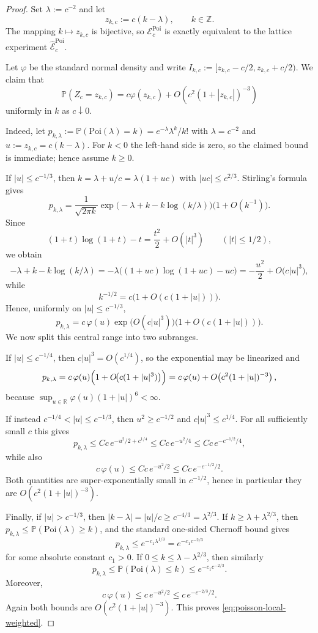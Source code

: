 \documentclass[10pt,a4paper]{amsart}
\newcommand{\Pbb}{\mathbb P}
\newcommand{\Poi}{\mathrm{Poi}}
\newcommand{\R}{\mathbb R}
\begin{document}
\begin{proof}
Set $\lambda:=c^{-2}$ and let
\[
z_{k,c}:=c(k-\lambda),\qquad k\in\mathbb Z.
\]
The mapping $k\mapsto z_{k,c}$ is bijective, so $\mathcal E_c^{\mathrm{Poi}}$ is exactly equivalent to the lattice
experiment $\widehat{\mathcal E}_c^{\mathrm{Poi}}$.

Let $\varphi$ be the standard normal density and write $I_{k,c}:=[z_{k,c}-c/2,z_{k,c}+c/2)$.
We claim that
\begin{equation}
\Pbb(Z_c=z_{k,c})
=
c\varphi(z_{k,c})+O\!\left(c^2(1+|z_{k,c}|)^{-3}\right)
\label{eq:poisson-local-weighted}
\end{equation}
uniformly in $k$ as $c\downarrow 0$.

Indeed, let $p_{k,\lambda}:=\Pbb(\Poi(\lambda)=k)=e^{-\lambda}\lambda^k/k!$ with $\lambda=c^{-2}$ and
$u:=z_{k,c}=c(k-\lambda)$. For $k<0$ the left-hand side is zero, so the claimed bound is immediate; hence assume
$k\ge 0$.

If $|u|\le c^{-1/3}$, then $k=\lambda+u/c=\lambda(1+uc)$ with $|uc|\le c^{2/3}$. Stirling's formula gives
\[
p_{k,\lambda}
=
\frac{1}{\sqrt{2\pi k}}
\exp\!\bigl(-\lambda+k-k\log(k/\lambda)\bigr)\bigl(1+O(k^{-1})\bigr).
\]
Since
\[
(1+t)\log(1+t)-t=\frac{t^2}{2}+O(|t|^3)
\qquad (|t|\le 1/2),
\]
we obtain
\[
-\lambda+k-k\log(k/\lambda)
=
-\lambda\bigl((1+uc)\log(1+uc)-uc\bigr)
=
-\frac{u^2}{2}+O\!\bigl(c|u|^3\bigr),
\]
while
\[
k^{-1/2}=c\bigl(1+O(c(1+|u|))\bigr).
\]
Hence, uniformly on $|u|\le c^{-1/3}$,
\[
p_{k,\lambda}
=
c\,\varphi(u)
\exp\!\bigl(O(c|u|^3)\bigr)
\bigl(1+O(c(1+|u|))\bigr).
\]
We now split this central range into two subranges.

If $|u|\le c^{-1/4}$, then $c|u|^3=O(c^{1/4})$, so the exponential may be linearized and
\[
p_{k,\lambda}
=
c\,\varphi(u)\Bigl(1+O\!\bigl(c(1+|u|^3)\bigr)\Bigr)
=
c\,\varphi(u)+O\!\left(c^2(1+|u|)^{-3}\right),
\]
because $\sup_{u\in\R}\varphi(u)(1+|u|)^6<\infty$.

If instead $c^{-1/4}<|u|\le c^{-1/3}$, then $u^2\ge c^{-1/2}$ and $c|u|^3\le c^{1/4}$. For all sufficiently
small $c$ this gives
\[
p_{k,\lambda}\le Cc\,e^{-u^2/2+c^{1/4}}\le Cc\,e^{-u^2/4}\le Cc\,e^{-c^{-1/2}/4},
\]
while also
\[
c\,\varphi(u)\le Cc\,e^{-u^2/2}\le Cc\,e^{-c^{-1/2}/2}.
\]
Both quantities are super-exponentially small in $c^{-1/2}$, hence in particular they are
$O\!\left(c^2(1+|u|)^{-3}\right)$.

Finally, if $|u|>c^{-1/3}$, then $|k-\lambda|=|u|/c\ge c^{-4/3}=\lambda^{2/3}$. If $k\ge \lambda+\lambda^{2/3}$,
then $p_{k,\lambda}\le \Pbb(\Poi(\lambda)\ge k)$, and the standard one-sided Chernoff bound gives
\[
p_{k,\lambda}\le e^{-c_1\lambda^{1/3}}=e^{-c_1c^{-2/3}}
\]
for some absolute constant $c_1>0$. If $0\le k\le \lambda-\lambda^{2/3}$, then similarly
\[
p_{k,\lambda}\le \Pbb(\Poi(\lambda)\le k)\le e^{-c_1c^{-2/3}}.
\]
Moreover,
\[
c\,\varphi(u)\le c\,e^{-u^2/2}\le c\,e^{-c^{-2/3}/2}.
\]
Again both bounds are $O\!\left(c^2(1+|u|)^{-3}\right)$. This proves
\eqref{eq:poisson-local-weighted}.


\end{proof}
\end{document}
